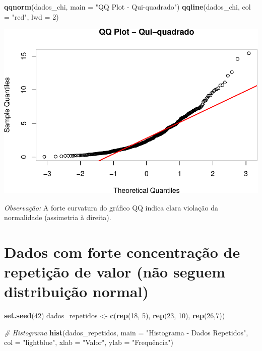 \documentclass[
]{book}
\newenvironment{Shaded}{\begin{snugshade}}{\end{snugshade}}
\newcommand{\AttributeTok}[1]{\textcolor[rgb]{0.13,0.29,0.53}{#1}}
\newcommand{\CommentTok}[1]{\textcolor[rgb]{0.56,0.35,0.01}{\textit{#1}}}
\newcommand{\DecValTok}[1]{\textcolor[rgb]{0.00,0.00,0.81}{#1}}
\newcommand{\FunctionTok}[1]{\textcolor[rgb]{0.13,0.29,0.53}{\textbf{#1}}}
\newcommand{\NormalTok}[1]{#1}
\newcommand{\OtherTok}[1]{\textcolor[rgb]{0.56,0.35,0.01}{#1}}
\newcommand{\StringTok}[1]{\textcolor[rgb]{0.31,0.60,0.02}{#1}}
\begin{document}
\begin{Shaded}
\begin{Highlighting}[]
\FunctionTok{qqnorm}\NormalTok{(dados\_chi, }\AttributeTok{main =} \StringTok{"QQ Plot {-} Qui{-}quadrado"}\NormalTok{)}
\FunctionTok{qqline}\NormalTok{(dados\_chi, }\AttributeTok{col =} \StringTok{"red"}\NormalTok{, }\AttributeTok{lwd =} \DecValTok{2}\NormalTok{)}
\end{Highlighting}
\end{Shaded}

\includegraphics{LivroEstatisticaR_files/figure-latex/nnormalDist-3.pdf}

\emph{Observação:} A forte curvatura do gráfico QQ indica clara violação da normalidade (assimetria à direita).

\section{Dados com forte concentração de repetição de valor (não seguem distribuição normal)}\label{dados-com-forte-concentrauxe7uxe3o-de-repetiuxe7uxe3o-de-valor-nuxe3o-seguem-distribuiuxe7uxe3o-normal}

\begin{Shaded}
\begin{Highlighting}[]
\FunctionTok{set.seed}\NormalTok{(}\DecValTok{42}\NormalTok{)}
\NormalTok{dados\_repetidos }\OtherTok{\textless{}{-}} \FunctionTok{c}\NormalTok{(}\FunctionTok{rep}\NormalTok{(}\DecValTok{18}\NormalTok{, }\DecValTok{5}\NormalTok{), }\FunctionTok{rep}\NormalTok{(}\DecValTok{23}\NormalTok{, }\DecValTok{10}\NormalTok{), }\FunctionTok{rep}\NormalTok{(}\DecValTok{26}\NormalTok{,}\DecValTok{7}\NormalTok{)) }

\CommentTok{\# Histograma}
\FunctionTok{hist}\NormalTok{(dados\_repetidos, }\AttributeTok{main =} \StringTok{"Histograma {-} Dados Repetidos"}\NormalTok{, }\AttributeTok{col =} \StringTok{"lightblue"}\NormalTok{, }\AttributeTok{xlab =} \StringTok{"Valor"}\NormalTok{, }\AttributeTok{ylab =} \StringTok{"Frequência"}\NormalTok{)}
\end{Highlighting}
\end{Shaded}
\end{document}
